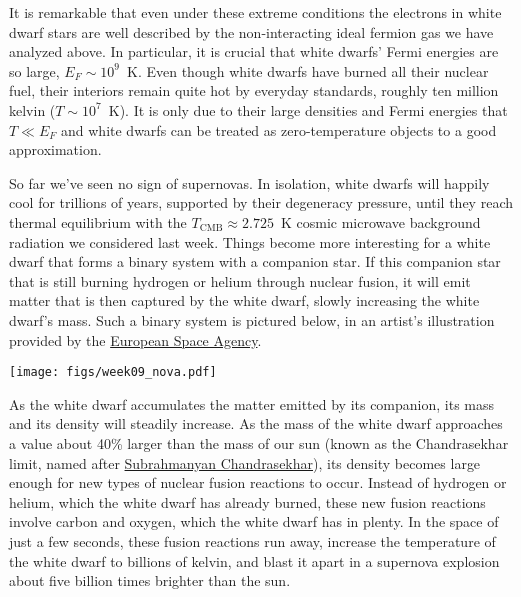 It is remarkable that even under these extreme conditions the electrons in white dwarf stars are well described by the non-interacting ideal fermion gas we have analyzed above.
In particular, it is crucial that white dwarfs' Fermi energies are so large, $E_F \sim 10^9$~K.
Even though white dwarfs have burned all their nuclear fuel, their interiors remain quite hot by everyday standards, roughly ten million kelvin ($T \sim 10^7$~K). %
It is only due to their large densities and Fermi energies that $T \ll E_F$ and white dwarfs can be treated as zero-temperature objects to a good approximation.

So far we've seen no sign of supernovas.
In isolation, white dwarfs will happily cool for trillions of years, supported by their degeneracy pressure, until they reach thermal equilibrium with the $T_{\text{CMB}} \approx 2.725$~K cosmic microwave background radiation we considered last week. %
Things become more interesting for a white dwarf that forms a binary system with a companion star.
If this companion star that is still burning hydrogen or helium through nuclear fusion, it will emit matter that is then captured by the white dwarf, slowly increasing the white dwarf's mass.
Such a binary system is pictured below, in an artist's illustration provided by the \href{https://www.esa.int/ESA_Multimedia/Images/2014/09/Artist_s_impression_of_Type_Ia_supernova}{European Space Agency}.

\begin{center}\texttt{[image: figs/week09\_nova.pdf]}\end{center}

As the white dwarf accumulates the matter emitted by its companion, its mass and its density will steadily increase.
As the mass of the white dwarf approaches a value about 40\% larger than the mass of our sun (known as the Chandrasekhar limit, named after \href{https://en.wikipedia.org/wiki/Subrahmanyan_Chandrasekhar}{Subrahmanyan Chandrasekhar}), its density becomes large enough for new types of nuclear fusion reactions to occur.
Instead of hydrogen or helium, which the white dwarf has already burned, these new fusion reactions involve carbon and oxygen, which the white dwarf has in plenty.
In the space of just a few seconds, these fusion reactions run away, increase the temperature of the white dwarf to billions of kelvin, and blast it apart in a supernova explosion about five billion times brighter than the sun.

